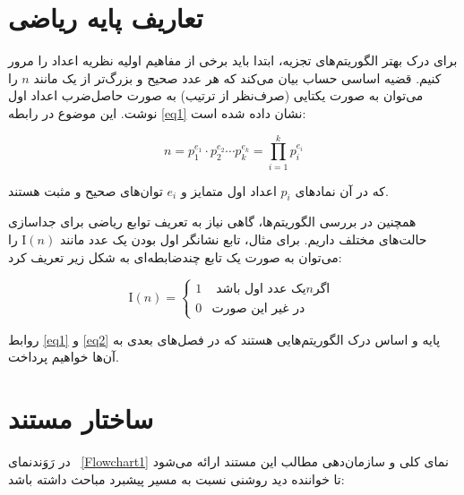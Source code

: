 \section{تعاریف پایه ریاضی}\label{sec:1-2}
برای درک بهتر الگوریتم‌های تجزیه، ابتدا باید برخی از مفاهیم اولیه نظریه اعداد را مرور کنیم. قضیه اساسی حساب بیان می‌کند که هر عدد صحیح و بزرگ‌تر از یک مانند $n$ را می‌توان به صورت یکتایی (صرف‌نظر از ترتیب) به صورت حاصل‌ضرب اعداد اول نوشت.\cite{hardy1979introduction} این موضوع در رابطه \eqref{eq1} نشان داده شده است:

\begin{equation}\label{eq1}
	n = p_1^{e_1} \cdot p_2^{e_2} \cdots p_k^{e_k} = \prod_{i=1}^{k} p_i^{e_i}
\end{equation}

که در آن نمادهای $p_i$ اعداد اول متمایز و $e_i$ توان‌های صحیح و مثبت هستند. 

همچنین در بررسی الگوریتم‌ها، گاهی نیاز به تعریف توابع ریاضی برای جداسازی حالت‌های مختلف داریم. برای مثال، تابع نشانگر اول بودن یک عدد مانند $\mathrm{I}(n)$ را می‌توان به صورت یک تابع چندضابطه‌ای به شکل زیر تعریف کرد:

\begin{equation}\label{eq2}
	\mathrm{I}(n) = \begin{cases} 
		1 &  \text{ یک عدد اول باشد} n \text{اگر } \\ 
		0 & \text{در غیر این صورت} 
	\end{cases}
\end{equation}

روابط \eqref{eq1} و \eqref{eq2} پایه و اساس درک الگوریتم‌هایی هستند که در فصل‌های بعدی به آن‌ها خواهیم پرداخت.

\section{ساختار مستند}\label{sec:1-3}

در رَوَندنمای
\figurename~\ref{Flowchart1}
 نمای کلی و سازمان‌دهی مطالب این مستند ارائه می‌شود تا خواننده دید روشنی نسبت به مسیر پیشبرد مباحث داشته باشد:

